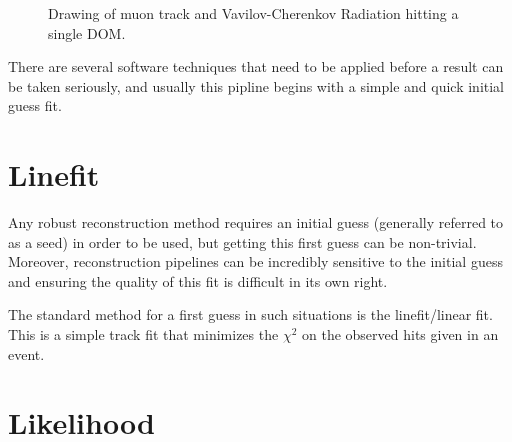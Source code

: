 \begin{figure}
  \centering
  \caption{Drawing of muon track and Vavilov-Cherenkov Radiation hitting a single DOM.}
  \label{fig:ghit}
\end{figure}



There are several software techniques that need to be applied before a result can be taken seriously, and usually this pipline begins with a simple and quick initial guess fit. 

\section{Linefit}

Any robust reconstruction method requires an initial guess (generally referred to as a seed) in order to be used, but getting this first guess can be non-trivial. Moreover, reconstruction pipelines can be incredibly sensitive to the initial guess and ensuring the quality of this fit is difficult in its own right.

The standard method for a first guess in such situations is the linefit/linear fit. This is a simple track fit that minimizes the $\chi^{2}$ on the observed hits given in an event. 


\section{Likelihood}


